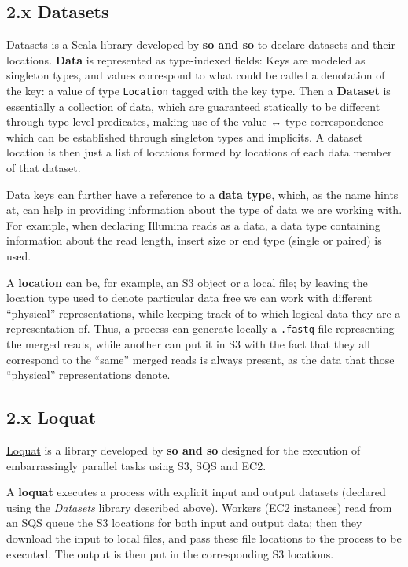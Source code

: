 \documentclass{frontiersSCNS} %
\begin{document}
\subsection{2.x Datasets}\label{x-datasets}

\href{https://github.com/ohnosequences/datasets}{Datasets} is a Scala
library developed by \textbf{so and so} to declare datasets and their
locations. \textbf{Data} is represented as type-indexed fields: Keys are
modeled as singleton types, and values correspond to what could be
called a denotation of the key: a value of type \texttt{Location} tagged
with the key type. Then a \textbf{Dataset} is essentially a collection
of data, which are guaranteed statically to be different through
type-level predicates, making use of the value ↔ type correspondence
which can be established through singleton types and implicits. A
dataset location is then just a list of locations formed by locations of
each data member of that dataset.

Data keys can further have a reference to a \textbf{data type}, which,
as the name hints at, can help in providing information about the type
of data we are working with. For example, when declaring Illumina reads
as a data, a data type containing information about the read length,
insert size or end type (single or paired) is used.

A \textbf{location} can be, for example, an S3 object or a local file;
by leaving the location type used to denote particular data free we can
work with different ``physical'' representations, while keeping track of
to which logical data they are a representation of. Thus, a process can
generate locally a \texttt{.fastq} file representing the merged reads,
while another can put it in S3 with the fact that they all correspond to
the ``same'' merged reads is always present, as the data that those
``physical'' representations denote.

\subsection{2.x Loquat}\label{x-loquat}

\href{https://github.com/ohnosequences/loquat}{Loquat} is a library
developed by \textbf{so and so} designed for the execution of
embarrassingly parallel tasks using S3, SQS and EC2.

A \textbf{loquat} executes a process with explicit input and output
datasets (declared using the \emph{Datasets} library described above).
Workers (EC2 instances) read from an SQS queue the S3 locations for both
input and output data; then they download the input to local files, and
pass these file locations to the process to be executed. The output is
then put in the corresponding S3 locations.
\end{document}
